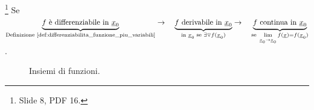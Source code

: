 \begin{property}\footnote{Slide 8, PDF 16.}
	Se $\underbrace{f\text{ è differenziabile in }\uline x_0}_{\text{Definizione \ref{def:differenziabilita_funzione_piu_variabili}}}\rightarrow\quad\underbrace{f \text{ derivabile in }\uline x_0}_{\text{in } \uline x_0 \text{ se } \exists\triangledown f(\uline x_0)}\rightarrow\quad \underbrace{f \text{ continua in }\uline x_0}_{\text{se } \lim\limits_{\uline x_0\rightarrow\uline x_0}f(\uline x)=f(\uline x_0)}$. 
\end{property}

\begin{figure}[ht]
	\centering
	
	\label{fig:diff_deriv_C}
	\caption{Insiemi di funzioni.}
\end{figure}

